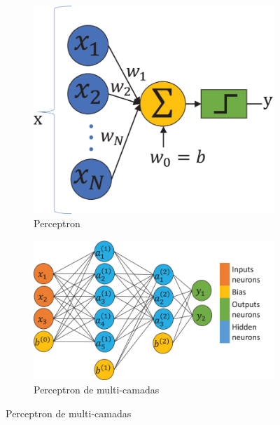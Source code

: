 \begin{figure}
	\centering
	\caption{Arquiteturas do Perceptron}
	\label{fig:perceptrons}
	\begin{subfigure}[b]{0.3\textwidth}
		\caption{Perceptron}
		\label{fig:perceptron}
		\includegraphics[width=\textwidth]{figs/perceptron}
	\end{subfigure}
	\qquad\qquad
	\begin{subfigure}[b]{0.3\textwidth}
		\caption{Perceptron de multi-camadas}
		\label{fig:mlp}
		\includegraphics[width=\textwidth]{figs/mlp}
	\end{subfigure}
\end{figure}

